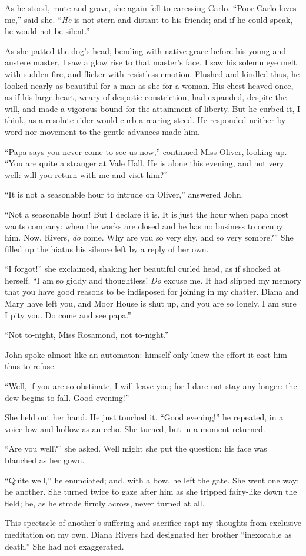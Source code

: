 As he stood, mute and grave, she again fell to caressing Carlo. 
\enquote{Poor Carlo loves me,} said she. \enquote{\emph{He} is not stern and
distant to his friends; and if he could speak, he would not be silent.}

As she patted the dog's head, bending with native grace before his young
and austere master, I saw a glow rise to that master's face. I saw his
solemn eye melt with sudden fire, and flicker with resistless emotion. 
Flushed and kindled thus, he looked nearly as beautiful for a man as she
for a woman. His chest heaved once, as if his large heart, weary of
despotic constriction, had expanded, despite the will, and made a
vigorous bound for the attainment of liberty. But he curbed it, I
think, as a resolute rider would curb a rearing steed. He responded
neither by word nor movement to the gentle advances made him.

\enquote{Papa says you never come to see us now,} continued Miss Oliver,
looking up. \enquote{You are quite a stranger at Vale Hall. He is
alone this evening, and not very well: will you return with me and visit
him?}

\enquote{It is not a seasonable hour to intrude on \Mr{} Oliver,} answered
\St{} John.

\enquote{Not a seasonable hour! But I declare it is. It is just the hour when
papa most wants company: when the works are closed and he has no
business to occupy him. Now, \Mr{} Rivers, \emph{do} come. Why are you
so very shy, and so very sombre?} She filled up the hiatus his silence
left by a reply of her own.

\enquote{I forgot!} she exclaimed, shaking her beautiful curled head, as
if shocked at herself. \enquote{I am so giddy and thoughtless! \emph{Do}
excuse me. It had slipped my memory that you have good reasons to be
indisposed for joining in my chatter. Diana and Mary have left you, and
Moor House is shut up, and you are so lonely. I am sure I pity you. Do
come and see papa.}

\enquote{Not to-night, Miss Rosamond, not to-night.}

\Mr{} \St{} John spoke almost like an automaton: himself only knew the
effort it cost him thus to refuse.

\enquote{Well, if you are so obstinate, I will leave you; for I dare not
stay any longer: the dew begins to fall. Good evening!}

She held out her hand. He just touched it. \enquote{Good evening!} he
repeated, in a voice low and hollow as an echo. She turned, but in a
moment returned.

\enquote{Are you well?} she asked. Well might she put the question: his
face was blanched as her gown.

\enquote{Quite well,} he enunciated; and, with a bow, he left the gate. 
She went one way; he another. She turned twice to gaze after him as she
tripped fairy-like down the field; he, as he strode firmly across, never
turned at all.

This spectacle of another's suffering and sacrifice rapt my thoughts
from exclusive meditation on my own. Diana Rivers had designated her
brother \enquote{inexorable as death.} She had not exaggerated.
